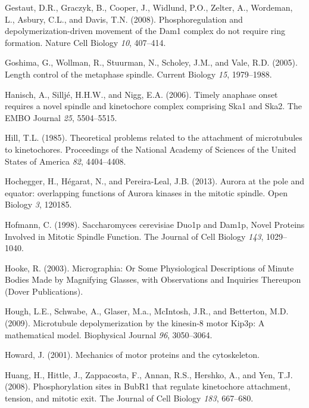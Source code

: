 \documentclass[12pt,a4paper,twoside,openright]{book}
\begin{document}
Gestaut, D.R., Graczyk, B., Cooper, J., Widlund, P.O., Zelter, A.,
Wordeman, L., Asbury, C.L., and Davis, T.N. (2008). Phosphoregulation
and depolymerization-driven movement of the Dam1 complex do not require
ring formation. Nature Cell Biology \emph{10}, 407--414.

Goshima, G., Wollman, R., Stuurman, N., Scholey, J.M., and Vale, R.D.
(2005). Length control of the metaphase spindle. Current Biology
\emph{15}, 1979--1988.

Hanisch, A., Silljé, H.H.W., and Nigg, E.A. (2006). Timely anaphase
onset requires a novel spindle and kinetochore complex comprising Ska1
and Ska2. The EMBO Journal \emph{25}, 5504--5515.

Hill, T.L. (1985). Theoretical problems related to the attachment of
microtubules to kinetochores. Proceedings of the National Academy of
Sciences of the United States of America \emph{82}, 4404--4408.

Hochegger, H., Hégarat, N., and Pereira-Leal, J.B. (2013). Aurora at the
pole and equator: overlapping functions of Aurora kinases in the mitotic
spindle. Open Biology \emph{3}, 120185.

Hofmann, C. (1998). Saccharomyces cerevisiae Duo1p and Dam1p, Novel
Proteins Involved in Mitotic Spindle Function. The Journal of Cell
Biology \emph{143}, 1029--1040.

Hooke, R. (2003). Micrographia: Or Some Physiological Descriptions of
Minute Bodies Made by Magnifying Glasses, with Observations and
Inquiries Thereupon (Dover Publications).

Hough, L.E., Schwabe, A., Glaser, M.a., McIntosh, J.R., and Betterton,
M.D. (2009). Microtubule depolymerization by the kinesin-8 motor Kip3p:
A mathematical model. Biophysical Journal \emph{96}, 3050--3064.

Howard, J. (2001). Mechanics of motor proteins and the cytoskeleton.

Huang, H., Hittle, J., Zappacosta, F., Annan, R.S., Hershko, A., and
Yen, T.J. (2008). Phosphorylation sites in BubR1 that regulate
kinetochore attachment, tension, and mitotic exit. The Journal of Cell
Biology \emph{183}, 667--680.
\end{document}
